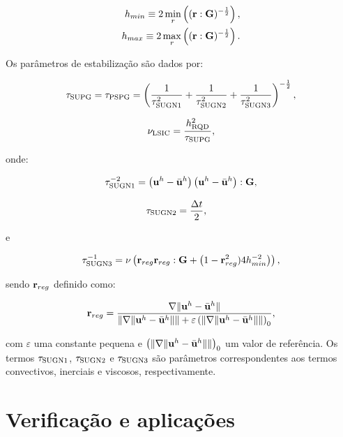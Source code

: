 \documentclass[tese_patricia]{subfiles}
\begin{document}
\begin{align}
	h_{min} \equiv 2\min_{r}\left((\mathbf{r}:\mathbf{G})^{-\frac{1}{2}} \right), \\
	h_{max} \equiv 2\max_{r}\left((\mathbf{r}:\mathbf{G})^{-\frac{1}{2}} \right).
\end{align}

Os parâmetros de estabilização são dados por:

\begin{align}
	\tau_{\mathrm{SUPG}} = \tau_{\mathrm{PSPG}} =\left(\frac{1}{\tau_{\mathrm{SUGN1}}^2} + \frac{1}{\tau_{\mathrm{SUGN2}}^2} + \frac{1}{\tau_{\mathrm{SUGN3}}^2} \right)^{-\frac{1}{2}},
\end{align}

\begin{align}
	\nu_{\mathrm{LSIC}} = \frac{h_{\mathrm{RQD}}^2}{\tau_{\mathrm{SUPG}}},
\end{align}

\noindent onde:

\begin{align}
	\tau_{\mathrm{SUGN1}}^{-2} = \left(\mathbf{u}^h - \bar{\mathbf{u}}^h \right) \left(\mathbf{u}^h - \bar{\mathbf{u}}^h \right) : \mathbf{G} ,
\end{align}

\begin{align}
	\tau_{\mathrm{SUGN2}}&=\frac{\Delta t}{2},
\end{align}

\noindent e

\begin{align}
	\tau_{\mathrm{SUGN3}}^{-1} = \nu \left(\mathbf{r}_{reg}\mathbf{r}_{reg} : \mathbf{G} + \left(1 - \mathbf{r}_{reg}^2)4h_{min}^{-2} \right)\right) ,
\end{align}

\noindent sendo $\mathbf{r}_{reg}$ definido como:

\begin{align}
	\mathbf{r}_{reg} =\frac{\nabla \lVert\mathbf{u}^h - \bar{\mathbf{u}}^h\rVert}{\lVert \nabla \lVert\mathbf{u}^h - \bar{\mathbf{u}}^h\rVert\rVert + \varepsilon\left(\lVert \nabla \lVert\mathbf{u}^h - \bar{\mathbf{u}}^h\rVert\rVert\right)_0},
\end{align}

\noindent com $\varepsilon$ uma constante pequena e $\left(\lVert \nabla \lVert\mathbf{u}^h- \bar{\mathbf{u}}^h\rVert\rVert\right)_0$ um valor de referência. Os termos $\tau_{\mathrm{SUGN1}}$, $\tau_{\mathrm{SUGN2}}$ e $\tau_{\mathrm{SUGN3}}$ são parâmetros correspondentes aos termos convectivos, inerciais e viscosos, respectivamente.

\section{Verificação e aplicações}
\end{document}
